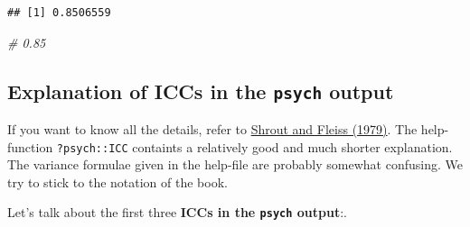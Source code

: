 \documentclass[
]{book}
\newenvironment{Shaded}{\begin{snugshade}}{\end{snugshade}}
\newcommand{\CommentTok}[1]{\textcolor[rgb]{0.56,0.35,0.01}{\textit{#1}}}
\begin{document}
\begin{verbatim}
## [1] 0.8506559
\end{verbatim}

\begin{Shaded}
\begin{Highlighting}[]
\CommentTok{\# 0.85}
\end{Highlighting}
\end{Shaded}

\subsection{\texorpdfstring{Explanation of ICCs in the \texttt{psych} output}{Explanation of ICCs in the psych output}}\label{explanation-of-iccs-in-the-psych-output}

If you want to know all the details, refer to \href{https://d1wqtxts1xzle7.cloudfront.net/50483847/syarat_reliabilitas_icc-libre.pdf?1479841049=&response-content-disposition=inline\%3B+filename\%3DIntraclass_Correlations_Uses_in_Assessin.pdf&Expires=1740684631&Signature=hHiFbcQD3PDVIyWDJ-bUhcm3WtsK19YhHm6FKtnafNdqsm9NhR6cr9lbCf~gVV5SYG1XlTwLlcfJkQ9Z-ahjmmNV893aWi5plo~yL4oZBEjrmFa9WCd7k6vzFTkri1Xbgfh~GyPARWXBtqABytovtL-RD1420Kw9qk150nw3-kUWcuvRiIc~r0y65XQaXf-V9mm~uXRFdUqec4Vs-Bwh~IrJfHWQASGgp8wZjzh2130MCP3-iaorxNn~79c~nm2f1aIl5WRqRXB6EIy8HlrNFpxNSt1pgTPZoZadEECM4qH395KLY5ijUnhoCDT9AmcOplPnFiC5t8dKW-n25ziofQ__&Key-Pair-Id=APKAJLOHF5GGSLRBV4ZA}{Shrout and Fleiss (1979)}.
The help-function \texttt{?psych::ICC} containts a relatively good and much shorter explanation.
The variance formulae given in the help-file are probably somewhat confusing.
We try to stick to the notation of the book.

Let's talk about the first three \textbf{ICCs in the \texttt{psych} output}:.
\end{document}

